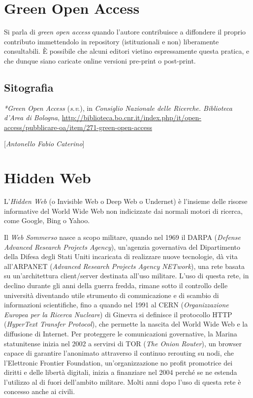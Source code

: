 {{\chapter{Green Open Access}

Si parla di \emph{green open access} quando l'autore contribuisce a
diffondere il proprio contributo immettendolo in repository
(istituzionali e non) liberamente consultabili. È possibile che alcuni
editori vietino espressamente questa pratica, e che dunque siano
caricate online versioni pre-print o post-print.

\section*{Sitografia}
{\parindent0pt 
\emph{*Green Open Access} (\emph{s.v}.), in \emph{Consiglio Nazionale
delle Ricerche. Biblioteca d'Area di Bologna},
\url{http://biblioteca.bo.cnr.it/index.php/it/open-access/pubblicare-oa/item/271-green-open-access}
}

\hrulefill 

{[}\emph{Antonello Fabio Caterino}{]}

\chapter{Hidden Web}

L'\emph{Hidden Web} (o Invisible Web o Deep Web o Undernet) è l'insieme
delle risorse informative del World Wide Web non indicizzate dai normali
motori di ricerca, come Google, Bing o Yahoo.

Il \emph{Web Sommerso} nasce a scopo militare, quando nel 1969 il DARPA
(\emph{Defense Advanced Research Projects Agency}), un'agenzia
governativa del Dipartimento della Difesa degli Stati Uniti incaricata
di realizzare nuove tecnologie, dà vita all'ARPANET (\emph{Advanced
Research Projects Agency NETwork}), una rete basata su un'architettura
client/server destinata all'uso militare. L'uso di questa rete, in
declino durante gli anni della guerra fredda, rimane sotto il controllo
delle università diventando utile strumento di comunicazione e di
scambio di informazioni scientifiche, fino a quando nel 1991 al CERN
(\emph{Organizzazione Europea per la Ricerca Nucleare}) di Ginevra si
definisce il protocollo HTTP (\emph{HyperText Transfer Protocol}), che
permette la nascita del World Wide Web e la diffusione di Internet. Per
proteggere le comunicazioni governative, la Marina statunitense inizia
nel 2002 a servirsi di TOR (\emph{The Onion Router}), un browser capace
di garantire l'anonimato attraverso il continuo rerouting su nodi, che
l'Elettronic Frontier Foundation, un'organizzazione no profit promotrice
dei diritti e delle libertà digitali, inizia a finanziare nel 2004
perché se ne estenda l'utilizzo al di fuori dell'ambito militare. Molti
anni dopo l'uso di questa rete è concesso anche ai civili.

}}
